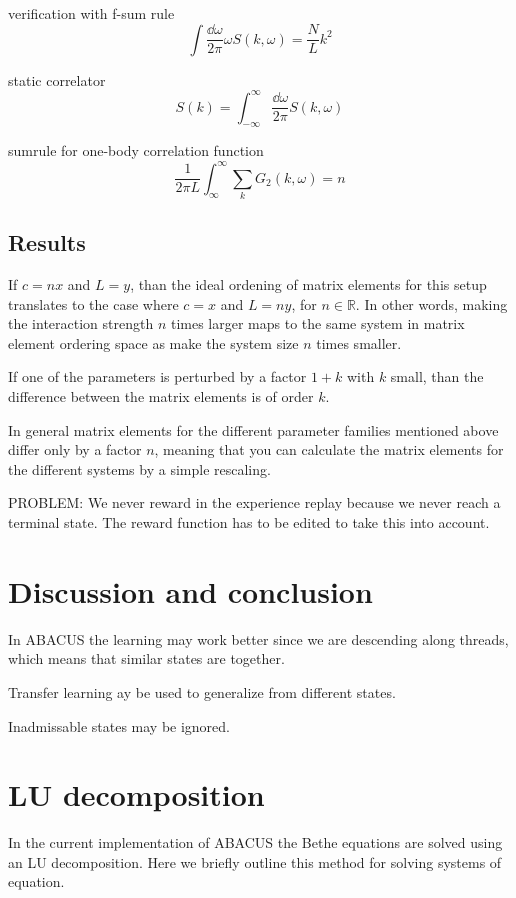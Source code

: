 \documentclass[11pt, a4paper]{report} %
\begin{document}
verification with f-sum rule \cite{Caux2007a}
\begin{equation}
    \int \frac{\dd \omega}{2\pi} \omega S(k, \omega) = \frac{N}{L} k^2
\end{equation}

static correlator \cite{Nardis2016}
\begin{equation}
  S(k) = \int_{-\infty}^{\infty}\frac{\dd \omega}{2\pi}S(k,\omega)
\end{equation}


sumrule for one-body correlation function \cite{Caux2007}
\begin{equation}
  \frac{1}{2\pi L} \int_{\infty}^{\infty}\sum_k G_2(k,\omega) = n
\end{equation}

\section{Results}

If $c = n  x$ and $L = y$, than the ideal ordening of matrix elements for this setup translates to the case where $c = x$ and $L = n y$, for $n \in \mathbb{R}$.
In other words, making the interaction strength $n$ times larger maps to the same system in matrix element ordering space as make the system size $n$ times smaller.

If one of the parameters is perturbed by a factor $1+k$ with $k$ small, than the difference between the matrix elements is of order $k$.

In general matrix elements for the different parameter families mentioned above differ only by a factor $n$, meaning that you can calculate the matrix elements for the different systems by a simple rescaling.

PROBLEM: We never reward in the experience replay because we never reach a terminal state. The reward function has to be edited to take this into account.

\chapter{Discussion and conclusion}\label{chap:conclusion}


In ABACUS the learning may work better since we are descending along threads, which means that similar states are together.

Transfer learning ay be used to generalize from different states.

Inadmissable states may be ignored.

\appendix
\chapter{LU decomposition}\label{app:LUdecomp}
In the current implementation of ABACUS the Bethe equations are solved using an LU decomposition. 
Here we briefly outline this method for solving systems of equation.



\end{document}
